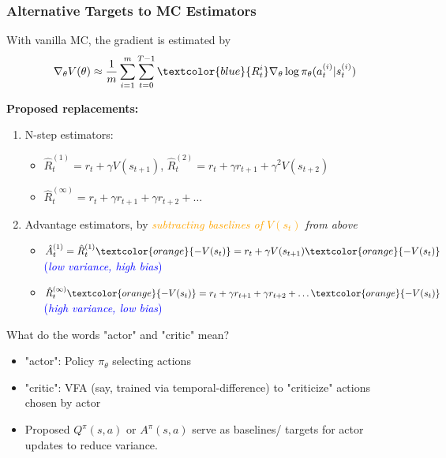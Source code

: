\documentclass{article}
\begin{document}
\begin{thmbox}
    \subsubsection*{Alternative Targets to MC Estimators}
    With vanilla MC, the gradient is estimated by
    \begin{equation*}
        \nabla_{\theta} V(\theta) \approx \frac{1}{m} \sum_{i = 1}^{m} \sum_{t = 0}^{T-1} \textcolor{blue}{R_{t}^{i}} \nabla_{\theta} \log \pi_{\theta} (a_t^{(i)} | s_t^{(i)})
    \end{equation*}

    \textbf{Proposed replacements:}
    \begin{enumerate}
    \item N-step estimators:
        \begin{itemize}
        \item $\hat{R}_t^{(1)} = r_t + \gamma V(s_{t+1})$, $\hat{R}_t^{(2)} = r_t + \gamma r_{t+1} + \gamma^2 V(s_{t+2})$ 
        \item $\hat{R}_t^{(\infty)} = r_t + \gamma r_{t+1} + \gamma r_{t+2} + \dots$
        \end{itemize}
    \item Advantage estimators, by \textit{\textcolor{orange}{subtracting baselines of $V(s_t)$} from above}
        \begin{itemize}
        \item $\hat{A}_t^{(1)} = \hat{R}_t^{(1)} \textcolor{orange}{- V(s_t)} = r_t + \gamma V(s_{t+1}) \textcolor{orange}{- V(s_t)}$ \quad \quad 
            \quad \quad \textcolor{blue}{(\textit{low variance, high bias})}
        \item $\hat{R}_t^{(\infty)} \textcolor{orange}{- V(s_t)} = r_t + \gamma r_{t+1} + \gamma r_{t+2} + \dots \textcolor{orange}{- V(s_t)}$
            \quad \quad \textcolor{blue}{(\textit{high variance, low bias})}
        \end{itemize}
    \end{enumerate}
\end{thmbox}

\begin{hintbox}
    What do the words "actor" and "critic" mean?
    \begin{prfbox}
        \begin{itemize}
        \item "actor": Policy $\pi_{\theta}$ selecting actions
        \item "critic": VFA (say, trained via temporal-difference) to "criticize" actions chosen by actor 
        \item Proposed $Q^{\pi}(s, a)$ or $A^{\pi}(s, a)$ serve as baselines/ targets for actor updates to reduce variance.
        \end{itemize}
    \end{prfbox}
\end{hintbox}
\end{document}
